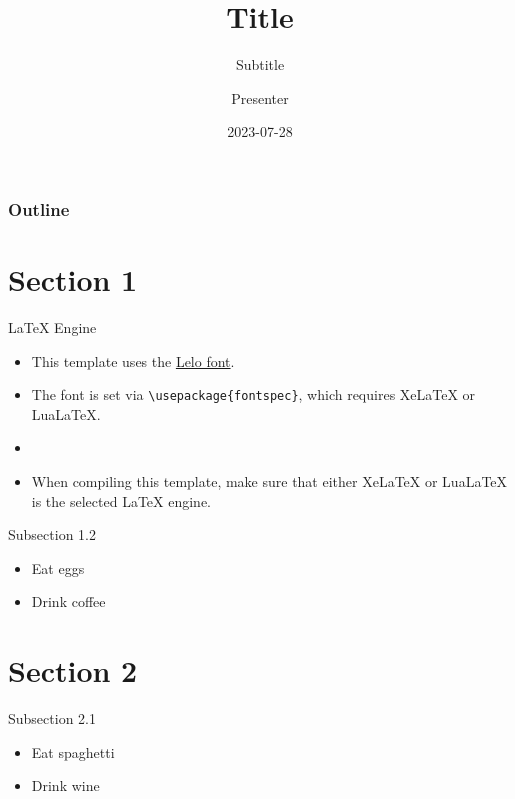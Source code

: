 \documentclass[
      10pt,
          aspectratio = 169,
  ]{beamer}
\title{Title}
\subtitle{Subtitle}
\author[Presenter]{Presenter}
\date{2023-07-28}
\institute{Institute}
\providecommand{\tightlist}{%
  \setlength{\itemsep}{0pt}\setlength{\parskip}{0pt}}
\begin{document}
  \begin{frame}[plain]{}
    \titlepage
  \end{frame}

  \begin{frame}
    \frametitle{Outline}
    \tableofcontents
  \end{frame}

\hypertarget{section-1}{%
\section{Section 1}\label{section-1}}

\begin{frame}[fragile]{LaTeX Engine}
\protect\hypertarget{latex-engine}{}
\begin{itemize}
\tightlist
\item
  This template uses the \href{https://camelot-typefaces.com/lelo}{Lelo
  font}.
\item
  The font is set via \texttt{\textbackslash{}usepackage\{fontspec\}},
  which requires XeLaTeX or LuaLaTeX.
\item
\item
  When compiling this template, make sure that either XeLaTeX or
  LuaLaTeX is the selected LaTeX engine.
\end{itemize}
\end{frame}

\begin{frame}{Subsection 1.2}
\protect\hypertarget{subsection-1.2}{}
\begin{itemize}
\tightlist
\item
  Eat eggs
\item
  Drink coffee
\end{itemize}
\end{frame}

\hypertarget{section-2}{%
\section{Section 2}\label{section-2}}

\begin{frame}{Subsection 2.1}
\protect\hypertarget{subsection-2.1}{}
\begin{itemize}
\tightlist
\item
  Eat spaghetti
\item
  Drink wine
\end{itemize}
\end{frame}
\end{document}
